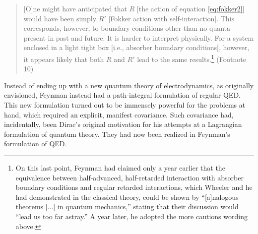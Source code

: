 \documentclass[12pt,a4paper]{article}
\begin{document}
\begin{quote}
[O]ne might have anticipated that $R$ [the action of equation \ref{eq:fokker2}] would have been simply $R'$ [Fokker action with self-interaction]. This corresponds, however, to boundary conditions other than no quanta present in past and future. It is harder to interpret physically. For a system enclosed in a light tight box [i.e., absorber boundary conditions], however, it appears likely that both $R$ and $R'$ lead to the same results.\footnote{On this last point, Feynman had claimed only a year earlier \citep[fn 7]{feynman_1949_space-time} that the equivalence between half-advanced, half-retarded interaction with absorber boundary conditions and regular retarded interactions, which Wheeler and he had demonstrated in the classical theory, could be shown by ``[a]nalogous theorems [...] in quantum mechanics,'' stating that their discussion would ``lead us too far astray.'' A year later, he adopted the more cautions wording above.} (Footnote 10)
\end{quote}

Instead of ending up with a new quantum theory of electrodynamics, as originally envisioned, Feynman instead had a path-integral formulation of regular QED. This new formulation turned out to be immensely powerful for the problems at hand, which required an explicit, manifest covariance. Such covariance had, incidentally, been Dirac's original motivation for his attempts at a Lagrangian formulation of quantum theory. They had now been realized in Feynman's formulation of QED.
\end{document}
